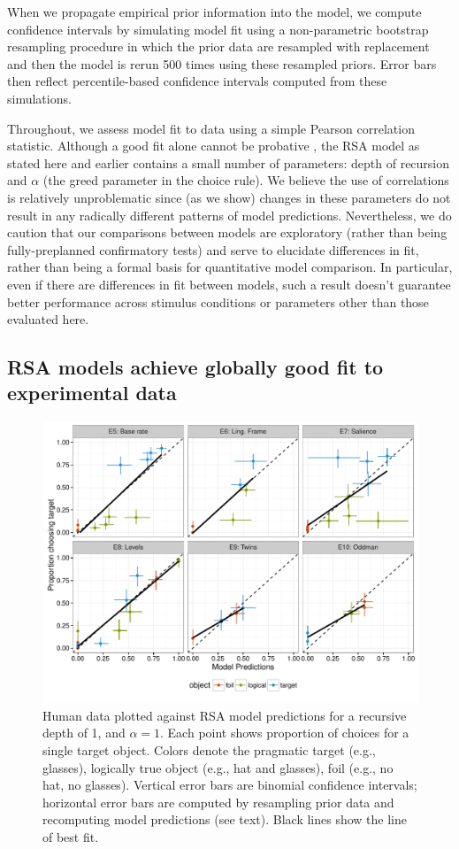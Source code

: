 \documentclass[man,noapacite]{apa2}
\begin{document}
When we propagate empirical prior information into the model, we compute confidence intervals by simulating model fit using a non-parametric bootstrap resampling procedure in which the prior data are resampled with replacement and then the model is rerun 500 times using these resampled priors. Error bars then reflect percentile-based confidence intervals computed from these simulations.

Throughout, we assess model fit to data using a simple Pearson correlation statistic. Although a good fit alone cannot be probative \cite{roberts2000}, the RSA model as stated here and earlier contains a small number of parameters: depth of recursion and $\alpha$ (the greed parameter in the choice rule). We believe the use of correlations is relatively unproblematic since (as we show) changes in these parameters do not result in any radically different patterns of model predictions. Nevertheless, we do caution that our comparisons between models are exploratory (rather than being fully-preplanned confirmatory tests) and serve to elucidate differences in fit, rather than being a formal basis for quantitative model comparison. In particular, even if there are differences in fit between models, such a result doesn't guarantee better performance across stimulus conditions or parameters other than those evaluated here.

\subsection{RSA models achieve globally good fit to experimental data}

\begin{figure}[t]
 \centering
 \includegraphics[width=6in]{../plots/model_basic.pdf}
 \caption{\label{fig:basic} Human data plotted against RSA model predictions for a recursive depth of 1, and $\alpha=1$. Each point shows proportion of choices for a single target object. Colors denote the pragmatic target (e.g., glasses), logically true object (e.g., hat and glasses), foil (e.g., no hat, no glasses). Vertical error bars are binomial confidence intervals; horizontal error bars are computed by resampling prior data and recomputing model predictions (see text). Black lines show the line of best fit.}
\end{figure}
\end{document}
